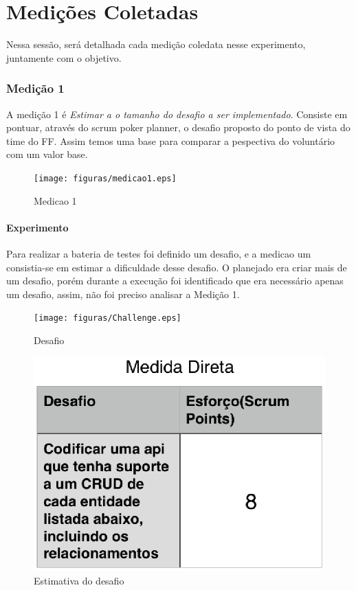 \chapter[Medições Coletadas]{Medições Coletadas}\label{cap4}

Nessa sessão, será detalhada cada medição coledata nesse experimento, juntamente com o
objetivo.

\subsection{Medição 1}

A medição 1 é \textit{Estimar a o tamanho do desafio a ser implementado}. Consiste em pontuar, através do
scrum poker planner, o desafio proposto do ponto de vista do time do FF. Assim temos uma base para comparar a pespectiva do voluntário com
um valor base.

\begin{figure}[H]
  \centering
  \label{fig:indicadores}
  \texttt{[image: figuras/medicao1.eps]}
  \caption{Medicao 1}
\end{figure}

\subsubsection{Experimento}


Para realizar a bateria de testes foi definido um desafio, e a medicao um consistia-se em estimar a dificuldade desse desafio. O planejado era criar mais de um desafio, porém durante
a execução foi identificado que era necessário apenas um desafio, assim, não foi  preciso analisar a Medição 1.

\begin{figure}[H]
  \centering
  \label{fig:indicadores}
  \texttt{[image: figuras/Challenge.eps]}
  \caption{Desafio}
\end{figure}

\begin{figure}[H]
  \centering
  \label{fig:indicadores}
  \includegraphics[keepaspectratio=true,scale=0.6]{figuras/Challenge_Scrum_Points.eps}
  \caption{Estimativa do desafio}
\end{figure}


